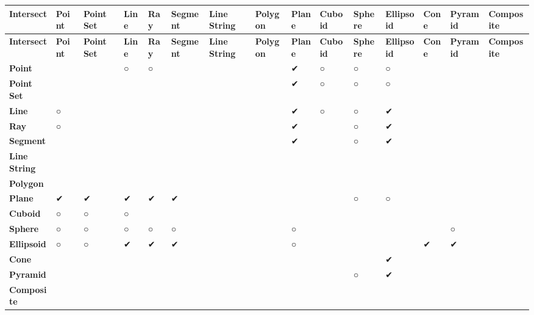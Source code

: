 \tabulinesep=1mm
\begin{longtabu} spread 0pt [c]{*{15}{|X[-1]}|}
\hline
\rowcolor{\tableheadbgcolor}\textbf{ Intersect }&\textbf{ Point }&\textbf{ Point Set }&\textbf{ Line }&\textbf{ Ray }&\textbf{ Segment }&\textbf{ Line String }&\textbf{ Polygon }&\textbf{ Plane }&\textbf{ Cuboid }&\textbf{ Sphere }&\textbf{ Ellipsoid }&\textbf{ Cone }&\textbf{ Pyramid }&\textbf{ Composite  }\\
\endfirsthead
\hline
\endfoot
\hline
\rowcolor{\tableheadbgcolor}\textbf{ Intersect }&\textbf{ Point }&\textbf{ Point Set }&\textbf{ Line }&\textbf{ Ray }&\textbf{ Segment }&\textbf{ Line String }&\textbf{ Polygon }&\textbf{ Plane }&\textbf{ Cuboid }&\textbf{ Sphere }&\textbf{ Ellipsoid }&\textbf{ Cone }&\textbf{ Pyramid }&\textbf{ Composite  }\\
\endhead
{\bfseries Point} &&&○ &○ &&&&✔ &○ &○ &○ &&&\\
{\bfseries Point Set} &&&&&&&&✔ &○ &○ &○ &&&\\
{\bfseries Line} &○ &&&&&&&✔ &○ &○ &✔ &&&\\
{\bfseries Ray} &○ &&&&&&&✔ &&○ &✔ &&&\\
{\bfseries Segment} &&&&&&&&✔ &&○ &✔ &&&\\
{\bfseries Line String} &&&&&&&&&&&&&&\\
{\bfseries Polygon} &&&&&&&&&&&&&&\\
{\bfseries Plane} &✔ &✔ &✔ &✔ &✔ &&&&&○ &○ &&&\\
{\bfseries Cuboid} &○ &○ &○ &&&&&&&&&&&\\
{\bfseries Sphere} &○ &○ &○ &○ &○ &&&○ &&&&&○ &\\
{\bfseries Ellipsoid} &○ &○ &✔ &✔ &✔ &&&○ &&&&✔ &✔ &\\
{\bfseries Cone} &&&&&&&&&&&✔ &&&\\
{\bfseries Pyramid} &&&&&&&&&&○ &✔ &&&\\
{\bfseries Composite} &&&&&&&&&&&&&&\\
\end{longtabu}
\tabulinesep=1mm
